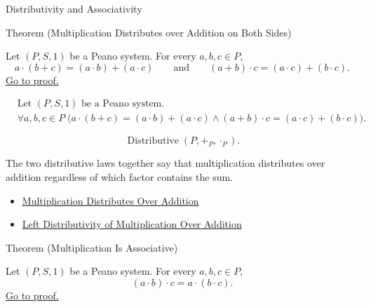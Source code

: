 \begin{topicbox}{Distributivity and Associativity}
\begin{theorembox}{Theorem (Multiplication Distributes over Addition on Both Sides)}
\begin{theorem}
\label{thm:multiplication-distributes-over-addition-both-sides}
Let $(P,S,1)$ be a Peano system. For every $a,b,c \in P$,
\[
a\cdot(b+c)=(a\cdot b)+(a\cdot c)
\qquad\text{and}\qquad
(a+b)\cdot c=(a\cdot c)+(b\cdot c).
\]
\hyperref[prf:multiplication-distributes-over-addition-both-sides]{Go to proof.}
\end{theorem}
\end{theorembox}

\begin{remark*}
\[
\begin{aligned}
&\text{Let } (P,S,1) \text{ be a Peano system.}\\
&\forall a,b,c \in P\;
\bigl(a\cdot(b+c)=(a\cdot b)+(a\cdot c)
\land
(a+b)\cdot c=(a\cdot c)+(b\cdot c)\bigr).
\end{aligned}
\]
\end{remark*}

\begin{remark*}
\[
\operatorname{Distributive}(P,+_P,\cdot_P).
\]
\end{remark*}

\begin{remark*}[Interpretation]
The two distributive laws together say that multiplication distributes over
addition regardless of which factor contains the sum.
\end{remark*}

\begin{dependencies}
\begin{itemize}
  \item \hyperref[thm:multiplication-distributes-over-addition]{Multiplication Distributes Over Addition}
  \item \hyperref[thm:left-distributivity-of-multiplication-over-addition]{Left Distributivity of Multiplication Over Addition}
\end{itemize}
\end{dependencies}

\begin{theorembox}{Theorem (Multiplication Is Associative)}
\begin{theorem}
\label{thm:multiplication-associative}
Let $(P,S,1)$ be a Peano system. For every $a,b,c \in P$,
\[
(a \cdot b) \cdot c = a \cdot (b \cdot c).
\]
\hyperref[prf:multiplication-associative]{Go to proof.}
\end{theorem}
\end{theorembox}


\end{topicbox}
